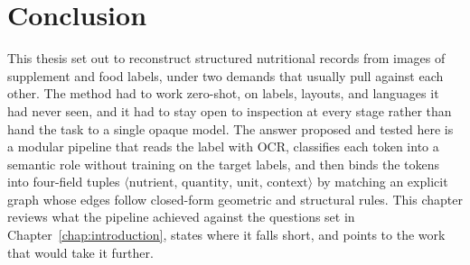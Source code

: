 %
%
%
%
%
%
%

\chapter{Conclusion}\label{chap:conclusion}

This thesis set out to reconstruct structured nutritional records from images of
supplement and food labels, under two demands that usually pull against each
other. The method had to work zero-shot, on labels, layouts, and languages it had
never seen, and it had to stay open to inspection at every stage rather than hand
the task to a single opaque model. The answer proposed and tested here is a
modular pipeline that reads the label with OCR, classifies each token into a
semantic role without training on the target labels, and then binds the tokens
into four-field tuples
$\langle\text{nutrient},\,\text{quantity},\,\text{unit},\,\text{context}\rangle$
by matching an explicit graph whose edges follow closed-form geometric and
structural rules. This chapter reviews what the pipeline achieved against the
questions set in Chapter~\ref{chap:introduction}, states where it falls short, and
points to the work that would take it further.

